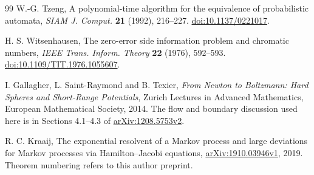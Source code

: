 \begin{thebibliography}{99}
W.-G. Tzeng, A polynomial-time algorithm for the equivalence of
probabilistic automata, \emph{SIAM J. Comput.} \textbf{21} (1992), 216--227.
\href{https://doi.org/10.1137/0221017}{doi:10.1137/0221017}.


H. S. Witsenhausen, The zero-error side information problem and chromatic
numbers, \emph{IEEE Trans. Inform. Theory} \textbf{22} (1976), 592--593.
\href{https://doi.org/10.1109/TIT.1976.1055607}{doi:10.1109/TIT.1976.1055607}.

I. Gallagher, L. Saint-Raymond and B. Texier,
\emph{From Newton to Boltzmann: Hard Spheres and Short-Range Potentials},
Zurich Lectures in Advanced Mathematics, European Mathematical Society, 2014.
The flow and boundary discussion used here is in Sections 4.1--4.3 of
\href{https://arxiv.org/abs/1208.5753v2}{arXiv:1208.5753v2}.

R. C. Kraaij, The exponential resolvent of a Markov process and large
deviations for Markov processes via Hamilton--Jacobi equations,
\href{https://arxiv.org/abs/1910.03946v1}{arXiv:1910.03946v1}, 2019.
Theorem numbering refers to this author preprint.

\end{thebibliography}
